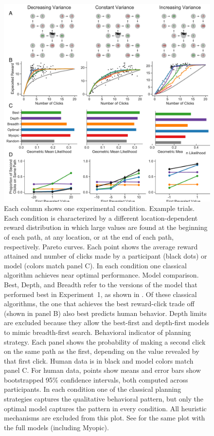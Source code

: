 \begin{figure}[p]
  \centering
  \includegraphics[width=\textwidth]{figs/planning/fig4.pdf}
  \caption{
    Each column shows one experimental condition.
     Example trials. Each condition is characterized by a different location-dependent reward distribution in which large values are found at the beginning of each path, at any location, or at the end of each path, respectively.
     Pareto curves. Each point shows the average reward attained and number of clicks made by a participant (black dots) or model (colors match panel C). In each condition one classical algorithm achieves near optimal performance.
     Model comparison. Best, Depth, and Breadth refer to the versions of the model that performed best in Experiment~1, as shown in . Of these classical algorithms, the one that achieves the best reward-click trade off (shown in panel B) also best predicts human behavior. Depth limits are excluded because they allow the best-first and depth-first models to mimic breadth-first search.
     Behavioral indicator of planning strategy. Each panel shows the probability of making a second click on the same path as the first, depending on the value revealed by that first click. Human data is in black and model colors match panel C. For human data, points show means and error bars show bootstrapped 95\% confidence intervals, both computed across participants. In each condition one of the classical planning strategies captures the qualitative behavioral pattern, but only the optimal model captures the pattern in every condition. All heuristic mechanisms are excluded from this plot. See  for the same plot with the full models (including Myopic).
  }
  \label{fig:planning-exp2}
\end{figure}



